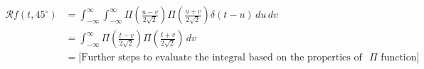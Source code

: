 \documentclass[12pt,twoside]{article}
\begin{document}
\begin{enumerate}
\begin{align*}
\mathcal{R}f(t, 45^\circ) &= \int_{-\infty}^{\infty} \int_{-\infty}^{\infty} \Pi\left(\frac{u-v}{2\sqrt{2}}\right) \Pi\left(\frac{u+v}{2\sqrt{2}}\right) \delta(t - u) \, du \, dv \\
&= \int_{-\infty}^{\infty} \Pi\left(\frac{t-v}{2\sqrt{2}}\right) \Pi\left(\frac{t+v}{2\sqrt{2}}\right) \, dv \\
&= \text{[Further steps to evaluate the integral based on the properties of the } \Pi \text{ function]}
\end{align*}

	

    \end{enumerate}
\end{document}

